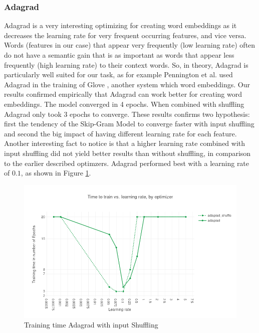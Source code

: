\subsubsection{Adagrad}\label{ssec:results_adagrad}
Adagrad \cite{adagrad} is a very interesting optimizing for creating word embeddings as it decreases the learning rate for very frequent occurring features, and vice versa. Words (features in our case) that appear very frequently (low learning rate) often do not have a semantic gain  that is as important as words that appear less frequently (high learning rate) to their context words. So, in theory, Adagrad is particularly well suited for our task, as for example Pennington et al. used Adagrad in the training of Glove \cite{glove}, another system which word embeddings. Our results confirmed empirically that Adagrad can work better for creating word embeddings. The  model converged in 4 epochs. When combined with shuffling Adagrad only took 3 epochs to converge. These results confirms two hypothesis: first  the tendency of the Skip-Gram Model to converge faster with input shuffling and second  the big impact of having different learning rate for each feature.
Another interesting fact to notice is that a higher learning rate combined with input shuffling did not yield better results than without shuffling, in comparison to the earlier described optimzers. Adagrad performed best with a learning rate of $0.1$, as shown in Figure \ref{fig:results_adagrad_shuffle}.
\begin{figure}[h]
\centering
\includegraphics[scale=0.3]{images/results_adagrad_shuffle}
\caption{Training time Adagrad with input Shuffling}
\label{fig:results_adagrad_shuffle}
\end{figure}
